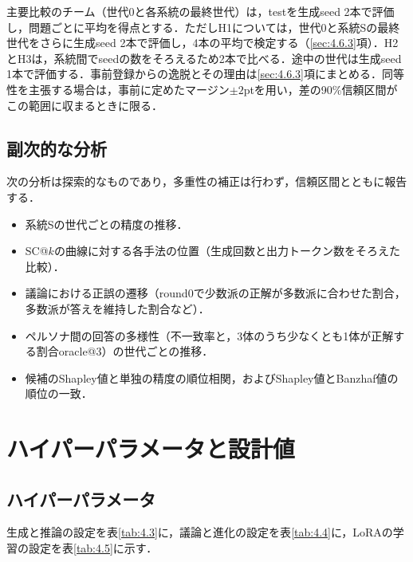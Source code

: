 主要比較のチーム（世代0と各系統の最終世代）は，testを生成seed 2本で評価し，問題ごとに平均を得点とする．ただしH1については，世代0と系統Sの最終世代をさらに生成seed 2本で評価し，4本の平均で検定する（\ref{sec:4.6.3}項）．H2とH3は，系統間でseedの数をそろえるため2本で比べる．途中の世代は生成seed 1本で評価する．事前登録からの逸脱とその理由は\ref{sec:4.6.3}項にまとめる．同等性を主張する場合は，事前に定めたマージン$\pm 2$ptを用い，差の90\%信頼区間がこの範囲に収まるときに限る．

\subsection{副次的な分析}
\label{sec:4.5.3}

次の分析は探索的なものであり，多重性の補正は行わず，信頼区間とともに報告する．
\begin{itemize}
\item 系統Sの世代ごとの精度の推移．
\item SC@$k$の曲線に対する各手法の位置（生成回数と出力トークン数をそろえた比較）．
\item 議論における正誤の遷移（round0で少数派の正解が多数派に合わせた割合，多数派が答えを維持した割合など）．
\item ペルソナ間の回答の多様性（不一致率と，3体のうち少なくとも1体が正解する割合oracle@3）の世代ごとの推移．
\item 候補のShapley値と単独の精度の順位相関，およびShapley値とBanzhaf値の順位の一致．
\end{itemize}

\section{ハイパーパラメータと設計値}
\label{sec:4.6}

\subsection{ハイパーパラメータ}
\label{sec:4.6.1}

生成と推論の設定を表\ref{tab:4.3}に，議論と進化の設定を表\ref{tab:4.4}に，LoRAの学習の設定を表\ref{tab:4.5}に示す．

